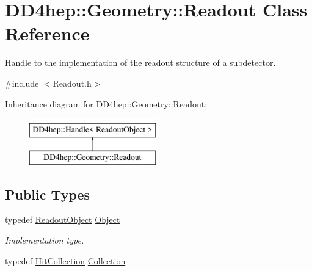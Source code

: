 \hypertarget{class_d_d4hep_1_1_geometry_1_1_readout}{}\section{D\+D4hep\+:\+:Geometry\+:\+:Readout Class Reference}
\label{class_d_d4hep_1_1_geometry_1_1_readout}


\hyperlink{class_d_d4hep_1_1_handle}{Handle} to the implementation of the readout structure of a subdetector.  




{\ttfamily \#include $<$Readout.\+h$>$}

Inheritance diagram for D\+D4hep\+:\+:Geometry\+:\+:Readout\+:\begin{figure}[H]
\begin{center}
\leavevmode
\includegraphics[height=2.000000cm]{class_d_d4hep_1_1_geometry_1_1_readout}
\end{center}
\end{figure}
\subsection*{Public Types}
\begin{DoxyCompactItemize}
\item 
typedef \hyperlink{class_d_d4hep_1_1_geometry_1_1_readout_object}{Readout\+Object} \hyperlink{class_d_d4hep_1_1_geometry_1_1_readout_ae25c79e6b7a94df1de7b1a2cf6df7ae4}{Object}
\begin{DoxyCompactList}\small\item\em Implementation type. \end{DoxyCompactList}\item 
typedef \hyperlink{class_d_d4hep_1_1_geometry_1_1_hit_collection}{Hit\+Collection} \hyperlink{class_d_d4hep_1_1_geometry_1_1_readout_ac1c39a13ec9bd42d658319fa48cac81d}{Collection}
\end{DoxyCompactItemize}
